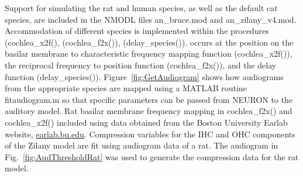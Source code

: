 Support for simulating the rat and human species, as well as the default cat
species, are included in the NMODL files \mbox{\textsf{an\_bruce.mod}} and
\mbox{\textsf{an\_zilany\_v4.mod}}.  Accommodation of different species is
implemented within the procedures (\mbox{\textsf{cochlea\_x2f()}},
(\mbox{\textsf{cochlea\_f2x()}}), (\mbox{\textsf{delay\_species()}}). occurs at
the position on the basilar membrane to characteristic frequency mapping
function (\mbox{\textsf{cochlea\_x2f()}}), the reciprocal frequency to position
function (\mbox{\textsf{cochlea\_f2x()}}), and the delay function
(\mbox{\textsf{delay\_species()}}).  Figure~\ref{fig:GetAudiogram} shows how
audiograms from the appropriate species are mapped using a MATLAB routine
\mbox{\textsf{fitaudiogram.m}} so that specific parameters can be passed from
NEURON to the auditory model.  Rat basilar membrane frequency mapping in
\mbox{\textsf{cochlea\_f2x()}} and \mbox{\textsf{cochlea\_x2f()}} included using
data obtained from the Boston University Earlab website, \url{earlab.bu.edu}.
Compression variables for the IHC and OHC components of the Zilany model are fit
using audiogram data of a rat.  The audiogram in Fig.~\ref{fig:AudThresholdRat}
was used to generate the compression data for the rat model.

\medskip{}





